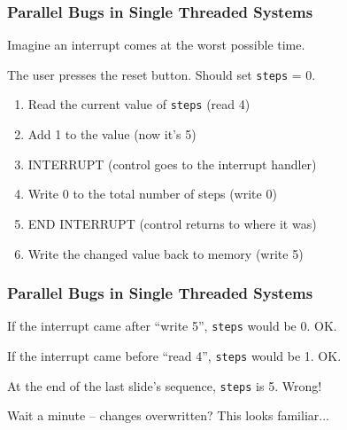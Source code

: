 \begin{frame}
\frametitle{Parallel Bugs in Single Threaded Systems}
\begin{changemargin}{1cm}
Imagine an interrupt comes at the worst possible time.

The user presses the reset button. Should set \texttt{steps} = 0.

\begin{enumerate}
	\item Read the current value of \texttt{steps} (read 4)
	\item Add 1 to the value (now it's 5)
	\item INTERRUPT (control goes to the interrupt handler)
	\item Write 0 to the total number of steps (write 0)
	\item END INTERRUPT (control returns to where it was)
	\item Write the changed value back to memory (write 5)
\end{enumerate}

\end{changemargin}
\end{frame}

\begin{frame}
\frametitle{Parallel Bugs in Single Threaded Systems}
\begin{changemargin}{1cm}

If the interrupt came after ``write 5'', \texttt{steps} would be 0. OK.

If the interrupt came before ``read 4'', \texttt{steps} would be 1. OK.

At the end of the last slide's sequence, \texttt{steps} is 5. Wrong! 

Wait a minute -- changes overwritten? This looks familiar...

\end{changemargin}
\end{frame}

